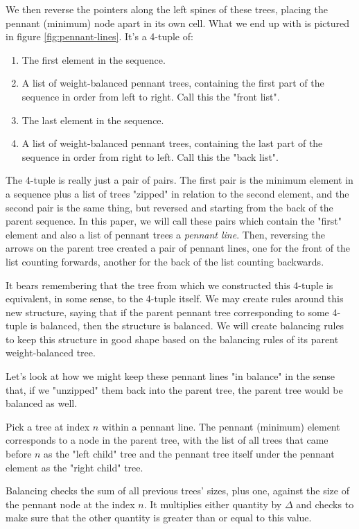 \documentclass[sigconf]{acmart}
\begin{document}
We then reverse the pointers along the left spines of these trees, placing the
pennant (minimum) node apart in its own cell.
What we end up with is pictured in figure \ref{fig:pennant-lines}. It's a
4-tuple of:

\begin{enumerate}
    \item The first element in the sequence.
    \item A list of weight-balanced pennant trees, containing the first part of
        the sequence in order from left to right. Call this the "front list".
    \item The last element in the sequence.
    \item A list of weight-balanced pennant trees, containing the last part of
        the sequence in order from right to left. Call this the "back list".
\end{enumerate}

The 4-tuple is really just a pair of pairs. The first pair is the minimum
element in a sequence plus a list of trees "zipped" in relation to the second
element, and the second pair is the same thing, but reversed and starting from
the back of the parent sequence. In this paper, we will call these pairs which
contain the "first" element and also a list of pennant trees a \emph{pennant
line}. Then, reversing the arrows on the parent tree created a pair of pennant
lines, one for the front of the list counting forwards, another for the back of
the list counting backwards.

It bears remembering that the tree from which we constructed this 4-tuple is
equivalent, in some sense, to the 4-tuple itself. We may create rules around
this new structure, saying that if the parent pennant tree corresponding to some
4-tuple is balanced, then the structure is balanced. We will create balancing
rules to keep this structure in good shape based on the balancing rules of its
parent weight-balanced tree.

Let's look at how we might keep these pennant lines "in balance" in the sense
that, if we "unzipped" them back into the parent tree, the parent tree would be
balanced as well.

Pick a tree at index $n$ within a pennant line. The pennant (minimum) element
corresponds to a node in the parent tree, with the list of all trees that came
before $n$ as the "left child" tree and the pennant tree itself under the pennant
element as the "right child" tree.

Balancing checks the sum of all previous trees' sizes, plus one, against the
size of the pennant node at the index $n$. It multiplies either quantity by
$\Delta$ and checks to make sure that the other quantity is greater than or
equal to this value.
\end{document}
